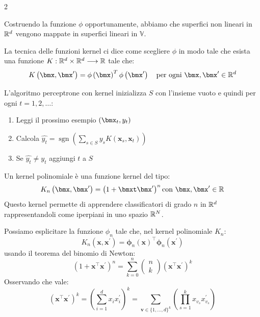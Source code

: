 \documentclass[\main/main.tex]{subfiles}
\begin{document}
\begin{multicols}{2}
\begin{observation}
    Costruendo la funzione \(\phi\) opportunamente, abbiamo che superfici non lineari in \(\mathbb{R}^d\) vengono mappate in superfici lineari in \(\mathbb{V}\).
\end{observation}
\begin{observation}
    La tecnica delle funzioni kernel ci dice come scegliere \(\phi\) in modo tale che esista una funzione \(K:\mathbb{R}^d\times \mathbb{R}^d\longrightarrow \mathbb{R}\) tale che:
    \[
        K\rnd{\bmx, \bmx'} = \phi\rnd{\bmx}^T\phi\rnd{\bmx'} \quad \text{per ogni }\bmx,\bmx' \in \R^d
    \]
\end{observation}
\begin{definition}
    L'algoritmo perceptrone con kernel inizializza \(S\) con l'insieme vuoto e quindi per ogni \(t=1,2,\ldots\):
    \begin{enumerate}
        \item Leggi il prossimo esempio \(\rnd{\bmx_t, y_t}\)
        \item Calcola \(\hat{y_t} = \operatorname{sgn}\left(\sum_{s \in S} y_{s} K\left(\boldsymbol{x}_{s}, \boldsymbol{x}_{t}\right)\right)\)
        \item Se \(\hat{y_t} \neq y_t\) aggiungi \(t\) a \(S\)
    \end{enumerate}
\end{definition}
\begin{definition}
    Un kernel polinomiale è una funzione kernel del tipo:
    \[
        K_n\rnd{\bmx,\bmx'} = \rnd{1+\bmxt\bmx'}^n \text{con }\bmx,\bmx' \in \R
    \]
    Questo kernel permette di apprendere classificatori di grado \(n\) in \(\mathbb{R}^d\) rappresentandoli come iperpiani in uno spazio \(\mathbb{R}^N\).    
\end{definition}
\begin{definition}
    Possiamo esplicitare la funzione \(\phi_n\) tale che, nel kernel polinomiale \(K_n\):
    \[K_{n}\left(\boldsymbol{x}, \boldsymbol{x}^{\prime}\right)=\boldsymbol{\phi}_{n}(\boldsymbol{x})^{\top} \boldsymbol{\phi}_{n}\left(\boldsymbol{x}^{\prime}\right)\]
    usando il teorema del binomio di Newton:
    \[\left(1+\boldsymbol{x}^{\top} \boldsymbol{x}^{\prime}\right)^{n}=\sum_{k=0}^{n} \left( \begin{array}{l}{n} \\ {k}\end{array}\right)\left(\boldsymbol{x}^{\top} \boldsymbol{x}^{\prime}\right)^{k}\]
    Osservando che vale:
    \[\left(\boldsymbol{x}^{\top} \boldsymbol{x}^{\prime}\right)^{k}=\left(\sum_{i=1}^{d} x_{i} x_{i}^{\prime}\right)^{k}=\sum_{\boldsymbol{v} \in\{1, \ldots, d\}^{k}}\left(\prod_{s=1}^{k} x_{v_{s}} x_{v_{s}}^{\prime}\right)\]

\end{definition}
\end{multicols}
\end{document}
